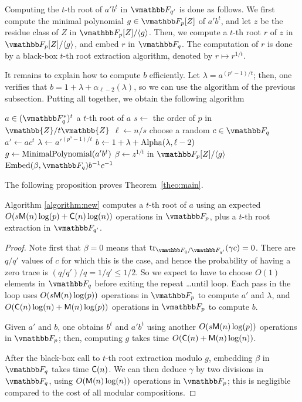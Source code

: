 Computing the $t$-th root of $a'b^t$ in $\F_{q'}$ is done as follows.
We first compute the minimal polynomial $g\in\F_p[Z]$ of $a'b^t$, and
let $z$ be the residue class of $Z$ in $\F_p[Z]/\langle g \rangle$.
Then, we compute a $t$-th root $r$ of $z$ in $\F_p[Z]/\langle g \rangle$, and
embed $r$ in $\F_q$. The computation of $r$ is done by a black-box
$t$-th root extraction algorithm, denoted by $r \mapsto r^{1/t}$.

It remains to explain how to compute $b$ efficiently. Let $\lambda =
a^{(p^s - 1) / t}$; then, one verifies that $b = 1 + \lambda +
\alpha_{\ell - 2}(\lambda)$, so we can use the algorithm of the
previous subsection. Putting all together, we obtain the following
algorithm

\begin{algorithm}
[$t$-th root in $\F_q^*$]
\label{algorithm:new}
\begin{algorithmic}[1]
\REQUIRE $a \in (\F_q^*)^t$
\ENSURE a $t$-th root of $a$
\STATE $s \leftarrow $ the order of $p$ in $\vmathbb{Z}/t\vmathbb{Z}$
\STATE $\ell \leftarrow n / s$
\REPEAT
\STATE choose a random $c \in \F_q$
\STATE $a'\leftarrow ac^t$
\STATE $\lambda \leftarrow {a'}^{(p^s-1)/t}$
\STATE $b \leftarrow 1+\lambda+{\rm Alpha}(\lambda,\ell-2)$
\STATE $g \leftarrow {\rm MinimalPolynomial}(a'b^t)$
\STATE $\beta \leftarrow z^{1/t}$ in $\F_p[Z]/\langle g\rangle$
\RETURN ${\rm Embed}(\beta,\F_q) b^{-1}c^{-1}$
\end{algorithmic}
\end{algorithm}

The following proposition proves Theorem~\ref{theo:main}.

\begin{proposition}
  Algorithm \ref{algorithm:new} computes a $t$-th root of $a$ using an
  expected $O(s\mathsf{M}(n)\log(p) + \mathsf{C}(n)\log(n))$ operations in $\F_p$,
  plus a $t$-th root extraction in $\F_{q'}$.
\end{proposition}
\begin{proof}
  Note first that $\beta=0$ means that $\trace_{\F_q / \F_{q'}}(\gamma
  c)=0$. There are $q/q'$ values of $c$ for which this is the case, 
  and hence the probability of having a zero trace is $(q/q')/q = 1/q'
  \le 1/2$. So we expect to have to choose $O(1)$ elements in $\F_q$ 
  before exiting the repeat \dots until loop. Each pass in the loop uses
  $O(s\mathsf{M}(n)\log(p))$ operations in $\F_p$ to compute $a'$ and
  $\lambda$, and $O(\mathsf{C}(n)\log(n) + \mathsf{M}(n)\log(p))$ operations in $\F_p$
  to compute $b$.

  Given $a'$ and $b$, one obtains $b^t$ and $a'b^t$ using another
  $O(s\mathsf{M}(n)\log(p))$ operations in $\F_p$; then, computing $g$ takes
  time $O(\mathsf{C}(n) + \mathsf{M}(n)\log(n))$. 

  After the black-box call to $t$-th root extraction modulo $g$,
  embedding $\beta$ in $\F_q$ takes time $\mathsf{C}(n)$. We can then deduce
  $\gamma$ by two divisions in $\F_q$, using $O(\mathsf{M}(n)\log(n))$
  operations in $\F_p$; this is negligible compared to the cost of all
  modular compositions.
\end{proof}

